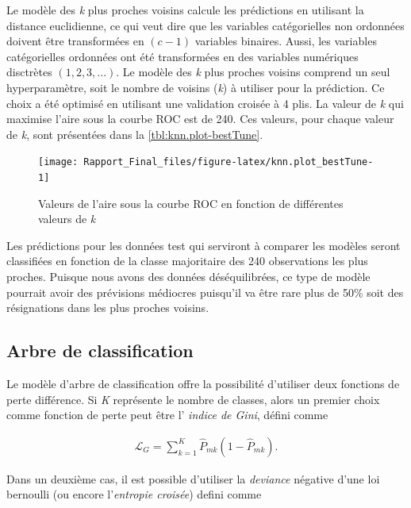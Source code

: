 \documentclass[]{article}
\begin{document}
Le modèle des \emph{k} plus proches voisins calcule les prédictions en
utilisant la distance euclidienne, ce qui veut dire que les variables
catégorielles non ordonnées doivent être transformées en \((c-1)\)
variables binaires. Aussi, les variables catégorielles ordonnées ont été
transformées en des variables numériques disctrètes \((1, 2, 3,...)\).
Le modèle des \emph{k} plus proches voisins comprend un seul
hyperparamètre, soit le nombre de voisins (\emph{k}) à utiliser pour la
prédiction. Ce choix a été optimisé en utilisant une validation croisée
à 4 plis. La valeur de \emph{k} qui maximise l'aire sous la courbe ROC
est de 240. Ces valeurs, pour chaque valeur de \emph{k}, sont présentées
dans la \autoref{tbl:knn.plot-bestTune}.

\begin{figure}

{\centering \texttt{[image: Rapport\_Final\_files/figure-latex/knn.plot\_bestTune-1]} 

}

\caption{\label{tbl:knn.plot-bestTune} Valeurs de l'aire sous la courbe ROC en fonction de différentes valeurs de \emph{k}}\label{fig:knn.plot_bestTune}
\end{figure}

Les prédictions pour les données test qui serviront à comparer les
modèles seront classifiées en fonction de la classe majoritaire des 240
observations les plus proches. Puisque nous avons des données
déséquilibrées, ce type de modèle pourrait avoir des prévisions
médiocres puisqu'il va être rare plus de 50\% soit des résignations dans
les plus proches voisins.

\newpage

\subsection{Arbre de classification}\label{arbre-de-classification}

Le modèle d'arbre de classification offre la possibilité d'utiliser deux
fonctions de perte différence. Si \emph{K} représente le nombre de
classes, alors un premier choix comme fonction de perte peut être l'
\emph{indice de Gini}, défini comme

\begin{align}
    \mathcal{L}_G = \sum_{k=1}^K \widehat{P}_{mk} (1 - \widehat{P}_{mk}).
\end{align}

Dans un deuxième cas, il est possible d'utiliser la \emph{deviance}
négative d'une loi bernoulli (ou encore l'\emph{entropie croisée})
defini comme
\end{document}
